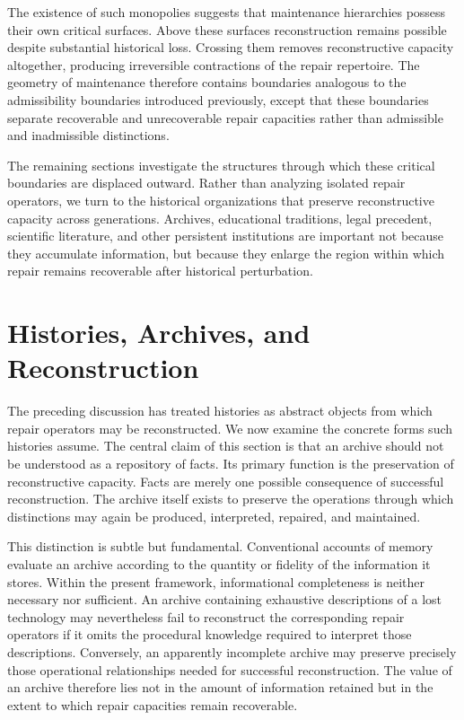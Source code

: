 \documentclass[12pt,oneside]{article}
\theoremstyle{plain}
\theoremstyle{definition}
\theoremstyle{remark}
\theoremstyle{plain}
\begin{document}
The existence of such monopolies suggests that maintenance hierarchies possess their own critical
surfaces. Above these surfaces reconstruction remains possible despite substantial historical loss.
Crossing them removes reconstructive capacity altogether, producing irreversible contractions of
the repair repertoire. The geometry of maintenance therefore contains boundaries analogous to the
admissibility boundaries introduced previously, except that these boundaries separate recoverable
and unrecoverable repair capacities rather than admissible and inadmissible distinctions.

The remaining sections investigate the structures through which these critical boundaries are
displaced outward. Rather than analyzing isolated repair operators, we turn to the historical
organizations that preserve reconstructive capacity across generations. Archives, educational
traditions, legal precedent, scientific literature, and other persistent institutions are important
not because they accumulate information, but because they enlarge the region within which repair
remains recoverable after historical perturbation.

\section{Histories, Archives, and Reconstruction}

The preceding discussion has treated histories as abstract objects from which repair operators may
be reconstructed. We now examine the concrete forms such histories assume. The central claim of
this section is that an archive should not be understood as a repository of facts. Its primary
function is the preservation of reconstructive capacity. Facts are merely one possible consequence
of successful reconstruction. The archive itself exists to preserve the operations through which
distinctions may again be produced, interpreted, repaired, and maintained.

This distinction is subtle but fundamental. Conventional accounts of memory evaluate an archive
according to the quantity or fidelity of the information it stores. Within the present framework,
informational completeness is neither necessary nor sufficient. An archive containing exhaustive
descriptions of a lost technology may nevertheless fail to reconstruct the corresponding repair
operators if it omits the procedural knowledge required to interpret those descriptions.
Conversely, an apparently incomplete archive may preserve precisely those operational relationships
needed for successful reconstruction. The value of an archive therefore lies not in the amount of
information retained but in the extent to which repair capacities remain recoverable.
\end{document}
